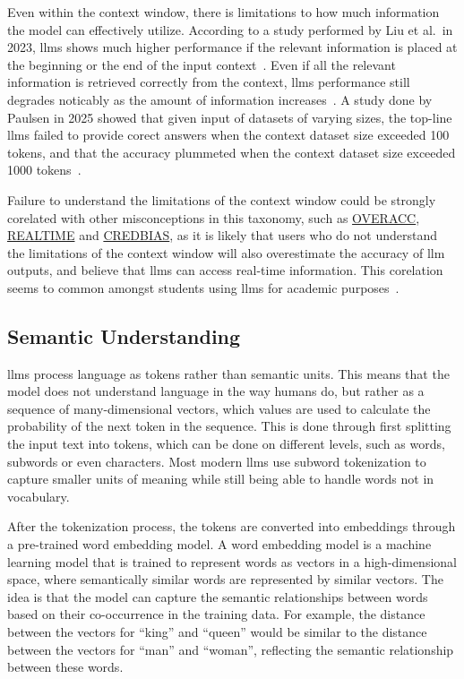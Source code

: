 Even within the context window, there is limitations to how much information the model can effectively utilize. According to a study performed by Liu et al.\ in 2023, \gls{llms} shows much higher performance if the relevant information is placed at the beginning or the end of the input context\ \cite{liu_lost_2024}. Even if all the relevant information is retrieved correctly from the context, \gls{llms} performance still degrades noticably as the amount of information increases\ \cite{du_context_2025}. A study done by Paulsen in 2025 showed that given input of datasets of varying sizes, the top-line \gls{llms} failed to provide corect answers when the context dataset size exceeded 100 tokens, and that the accuracy plummeted when the context dataset size exceeded 1000 tokens\ \cite{paulsen_context_2025}.

Failure to understand the limitations of the context window could be strongly corelated with other misconceptions in this taxonomy, such as \hyperref[overacc]{OVERACC}, \hyperref[realtime]{REALTIME} and \hyperref[credbias]{CREDBIAS}, as it is likely that users who do not understand the limitations of the context window will also overestimate the accuracy of \gls{llm} outputs, and believe that \gls{llms} can access real-time information. This corelation seems to common amongst students using \gls{llms} for academic purposes\ \cite{obrien_user_2025,rismanchian_what_2026}.

\subsection{Semantic Understanding}\label{semunder}
\gls{llms} process language as tokens rather than semantic units. This means that the model does not understand language in the way humans do, but rather as a sequence of many-dimensional vectors, which values are used to calculate the probability of the next token in the sequence. This is done through first splitting the input text into tokens, which can be done on different levels, such as words, subwords or even characters. Most modern \gls{llms} use subword tokenization to capture smaller units of meaning while still being able to handle words not in vocabulary. 

After the tokenization process, the tokens are converted into embeddings through a pre-trained word embedding model. A word embedding model is a machine learning model that is trained to represent words as vectors in a high-dimensional space, where semantically similar words are represented by similar vectors. The idea is that the model can capture the semantic relationships between words based on their co-occurrence in the training data. For example, the distance between the vectors for ``king'' and ``queen'' would be similar to the distance between the vectors for ``man'' and ``woman'', reflecting the semantic relationship between these words.

